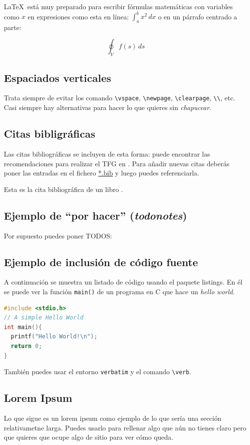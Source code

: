 \LaTeX\ está muy preparado para escribir fórmulas matemáticas con variables como $x$ en expresiones como esta en línea: \(\int_{a}^{b} x^2 \,dx\) o en un párrafo centrado a parte:

\begin{displaymath}
  \oint_V f(s) \,ds
\end{displaymath}

\subsection{Espaciados verticales}

Trata siempre de evitar los comando \verb|\vspace|, \verb|\newpage|, \verb|\clearpage|, \verb|\\|, etc. Casi siempre hay alternativas para hacer lo que quieres sin \emph{chapucear}.

\subsection{Citas bibligráficas}

Las citas bibliográficas se incluyen de esta forma: puede encontrar
las recomendaciones para realizar el TFG en
\cite{recomendaciones}. Para añadir nuevas citas deberás poner las
entradas en el fichero \url{*.bib} y luego puedes referenciarla.

Esta es la cita bibliográfica de un libro \cite{stallings2006}.

\subsection{Ejemplo de ``por hacer'' (\emph{todonotes})}

Por supuesto puedes poner TODOS:%


\subsection{Ejemplo de inclusión de código fuente}

A continuación se muestra un listado de código usando el paquete listings. En él se puede ver la función \lstinline{main()} de un programa en C que hace un \emph{hello world}.
\begin{lstlisting}[language=c]
#include <stdio.h>
// A simple Hello World
int main(){
  printf("Hello World!\n");
  return 0;
}
\end{lstlisting}

También puedes usar el entorno \texttt{verbatim} y el comando \verb|\verb|.

\subsection{Lorem Ipsum}
Lo que sigue es un lorem ipsum como ejemplo de lo que sería una
sección relativametne larga. Puedes usarlo para rellenar algo que aún
no tienes claro pero que quieres que ocupe algo de sitio para ver cómo
queda.

\lipsum
